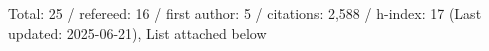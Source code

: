 Total: 25 / refereed: 16 / first author: 5 / citations: 2,588 / h-index: 17 (Last updated: 2025-06-21), List attached below